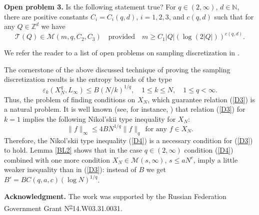 \documentclass[12pt]{article}
\newcommand{\N}{{\mathbb{N}}}
\def \Tr{\mathcal T}
\def \cM{\mathcal M}
\def\Z{\mathbb Z}
\def \e{\varepsilon}
\numberwithin{equation}{section}
\newcommand{\be}{\begin{equation}}
\newcommand{\ee}{\end{equation}}
\begin{document}
 {\bf Open problem 3.} Is the following statement true? For $q\in (2,\infty)$, $d\in \N$, there are positive constants $C_i=C_i(q,d)$, $i=1,2,3$, and $c(q,d)$ such that for any $Q\in \Z^d$ we have
 $$
 \Tr(Q) \in \cM(m,q,C_2,C_3) \quad \text{provided} \quad m\ge C_1|Q| (\log (2|Q|))^{c(q,d)}.
 $$
 
 We refer the reader to a list of open problems on sampling discretization in \cite{DPTT}. 

The cornerstone of the above discussed technique of proving the sampling discretization results is the entropy bounds of the type
\be\label{D3}
\e_k(X^q_N,L_\infty) \le  B (N/k)^{1/q}, \quad 1\leq k\le N,\quad 1\le q<\infty.
\ee
Thus, the problem of finding conditions on $X_N$, which guarantee relation (\ref{D3}) is a natural problem. It is well known (see, for instance, \cite{DPSTT1}) that relation (\ref{D3}) for $k=1$  implies the following Nikol'skii type inequality for $X_N$:
\be\label{D4}
	\|f\|_\infty \le 4BN^{1/q}\|f\|_q\   \ \text{for any $f\in X_N$.}
\ee
Therefore, the Nikol'skii type inequality (\ref{D4}) is a necessary condition for (\ref{D3}) to hold.
Lemma \ref{BL2} shows that in the case $q\in (2,\infty)$ condition (\ref{D4}) combined with one more condition $X_N\in \cM(s,\infty)$, $s\le aN^c$, imply a little weaker inequality than in (\ref{D3}): instead of $B$ we get $B'= BC(q,a,c)(\log N)^{1/q}$. 

  {\bf Acknowledgment.} The work was supported by the Russian Federation Government Grant N{\textsuperscript{\underline{o}}}14.W03.31.0031.
\end{document}
